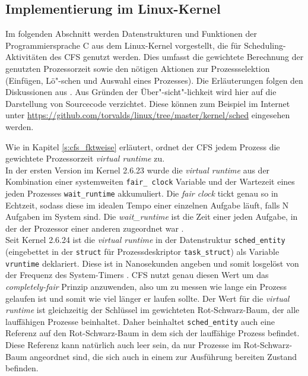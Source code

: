 \subsection{Implementierung im Linux-Kernel}\label{s:cstructs}
Im folgenden Abschnitt werden Datenstrukturen und Funktionen der Programmiersprache C aus dem Linux-Kernel vorgestellt, die für Scheduling-Aktivitäten des CFS genutzt werden. Dies umfasst die gewichtete Berechnung der genutzten Prozessorzeit sowie den nötigen Aktionen zur Prozessselektion (Einfügen, Lö"-schen und Auswahl eines Prozesses). Die Erläuterungen folgen den Diskussionen aus \cite{rlove}. Aus Gründen der Über"-sicht"-lichkeit wird hier auf die Darstellung von Sourcecode verzichtet. Diese können zum Beispiel im Internet unter \url{https://github.com/torvalds/linux/tree/master/kernel/sched} eingesehen werden.

Wie in Kapitel \ref{s:cfs_fktweise} erläutert, ordnet der CFS jedem Prozess die gewichtete Prozessorzeit \textit{virtual runtime} zu. \\
In der ersten Version im Kernel 2.6.23 wurde die \textit{virtual runtime} aus der Kombination einer systemweiten \texttt{fair\_ clock} Variable und der Wartezeit eines jeden Prozesses \texttt{wait\_runtime} akkumuliert. Die \textit{fair clock} tickt genau so in Echtzeit, sodass diese im idealen Tempo einer einzelnen Aufgabe läuft, falls N Aufgaben im System sind. Die \textit{wait\_runtime} ist die Zeit einer jeden Aufgabe, in der der Prozessor einer anderen zugeordnet war \cite{cpabla}.\\
Seit Kernel 2.6.24 ist die \textit{virtual runtime} in der Datenstruktur \texttt{sched\_entity} (eingebettet in der \texttt{struct} für Prozessdeskriptor \texttt{task\_struct}) als Variable \texttt{vruntime} deklariert. Diese ist in Nanosekunden angeben und somit losgelöst von der Frequenz des System-Timers \cite{rlove}. CFS nutzt genau diesen Wert um das \textit{completely-fair} Prinzip anzuwenden, also um zu messen wie lange ein Prozess gelaufen ist und somit wie viel länger er laufen sollte.
Der Wert für die \textit{virtual runtime} ist gleichzeitig der Schlüssel im gewichteten Rot-Schwarz-Baum, der alle lauffähigen Prozesse beinhaltet. Daher beinhaltet \texttt{sched\_entity} auch eine Referenz auf den Rot-Schwarz-Baum in dem sich der lauffähige Prozess befindet. Diese Referenz kann natürlich auch leer sein, da nur Prozesse im Rot-Schwarz-Baum angeordnet sind, die sich auch in einem zur Ausführung bereiten Zustand befinden.

